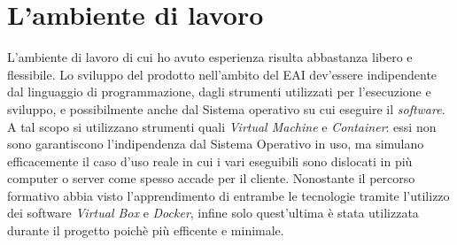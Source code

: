 \section{L’ambiente di lavoro}

L'ambiente di lavoro di cui ho avuto esperienza risulta abbastanza libero e flessibile.
Lo sviluppo del prodotto nell'ambito del EAI dev'essere indipendente dal linguaggio di programmazione, dagli strumenti utilizzati per l'esecuzione e sviluppo, e possibilmente anche dal Sistema operativo su cui eseguire il \textit{software}.
A tal scopo si utilizzano strumenti quali \textit{Virtual Machine} e \textit{Container}: essi non sono garantiscono l'indipendenza dal Sistema Operativo in uso, ma simulano efficacemente il caso d'uso reale in cui i vari eseguibili sono dislocati in più computer o server come spesso accade per il cliente.
Nonostante il percorso formativo abbia visto l'apprendimento di entrambe le tecnologie tramite l'utilizzo dei software \textit{Virtual Box} e \textit{Docker}, infine solo quest'ultima è stata utilizzata durante il progetto poichè più efficente e minimale.
